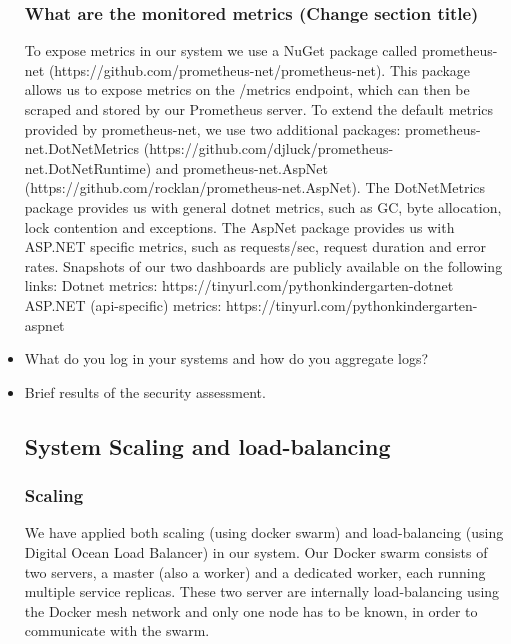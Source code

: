 \begin{itemize}
  \subsubsection{What are the monitored metrics (Change section title)}
  To expose metrics in our system we use a NuGet package called prometheus-net (https://github.com/prometheus-net/prometheus-net).
  This package allows us to expose metrics on the /metrics endpoint, which can then be scraped and stored by our Prometheus server.
  \newline
  To extend the default metrics provided by prometheus-net, we use two additional packages: 
  prometheus-net.DotNetMetrics (https://github.com/djluck/prometheus-net.DotNetRuntime) and prometheus-net.AspNet (https://github.com/rocklan/prometheus-net.AspNet).
  \newline
  The DotNetMetrics package provides us with general dotnet metrics, such as GC, byte allocation, lock contention and exceptions.
  \newline
  The AspNet package provides us with ASP.NET specific metrics, such as requests/sec, request duration and error rates.
  \newline
  \newline
  Snapshots of our two dashboards are publicly available on the following links:
  \newline
  Dotnet metrics: https://tinyurl.com/pythonkindergarten-dotnet
  \newline
  ASP.NET (api-specific) metrics: https://tinyurl.com/pythonkindergarten-aspnet
  \item What do you log in your systems and how do you aggregate logs?
  \item Brief results of the security assessment.
  \subsection{System Scaling and load-balancing}
  \subsubsection{Scaling}
  We have applied both scaling (using docker swarm) and load-balancing (using Digital Ocean Load Balancer) in our system. 
  Our Docker swarm consists of two servers, a master (also a worker) and a dedicated worker, each running multiple service replicas. 
  These two server are internally load-balancing using the Docker mesh network and only one node has to be known, in order to communicate with the swarm.


\end{itemize}
